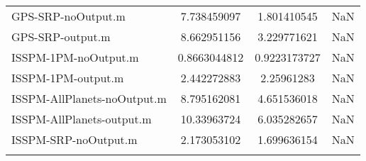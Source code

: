 \begin{table}[htbp!]
\begin{tabular}{lccc}
         GPS-SRP-noOutput.m & 7.738459097 & 1.801410545 & NaN \\
         GPS-SRP-output.m & 8.662951156 & 3.229771621 & NaN \\
         ISSPM-1PM-noOutput.m & 0.8663044812 & 0.9223173727 & NaN \\
         ISSPM-1PM-output.m & 2.442272883 & 2.25961283 & NaN \\
         ISSPM-AllPlanets-noOutput.m & 8.795162081 & 4.651536018 & NaN \\
         ISSPM-AllPlanets-output.m & 10.33963724 & 6.035282657 & NaN \\
         ISSPM-SRP-noOutput.m & 2.173053102 & 1.699636154 & NaN \\
      \hline\hline
      \label{Table: Performance2-1} 
\end{tabular}
\end{table}
